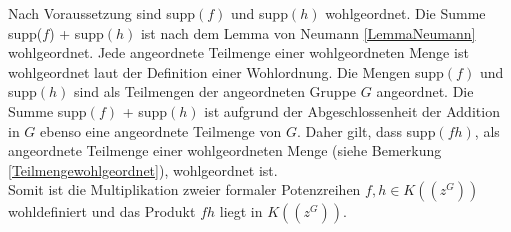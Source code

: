 {%
Nach Voraussetzung sind supp$(f)$ und supp$(h)$ wohlgeordnet. Die Summe supp($f$) + supp$(h)$ ist nach dem Lemma von Neumann \ref{LemmaNeumann} wohlgeordnet. Jede angeordnete Teilmenge einer wohlgeordneten Menge ist wohlgeordnet laut der Definition einer Wohlordnung. Die Mengen supp$(f)$ und supp$(h)$ sind als Teilmengen der angeordneten Gruppe $G$ angeordnet. Die Summe supp$(f)$ + supp$(h)$ ist aufgrund der Abgeschlossenheit der Addition in $G$ ebenso eine angeordnete Teilmenge von $G$. Daher gilt, dass supp$(fh)$, als angeordnete Teilmenge einer wohlgeordneten Menge (siehe Bemerkung \ref{Teilmengewohlgeordnet}), wohlgeordnet ist. \\
Somit ist die Multiplikation zweier formaler Potenzreihen $f,h \in K\left(\left(z^G\right)\right)$ wohldefiniert und das Produkt $fh$ liegt in $K\left(\left(z^G\right)\right)$.



}
